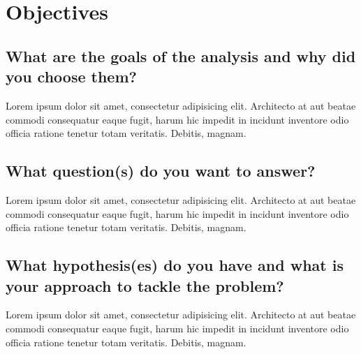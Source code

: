 \section{Objectives}

\subsection{What are the goals of the analysis and why did you choose them?}

Lorem ipsum dolor sit amet, consectetur adipisicing elit. Architecto at aut beatae commodi consequatur eaque fugit, harum hic impedit in incidunt inventore odio officia ratione tenetur totam veritatis. Debitis, magnam.

\subsection{What question(s) do you want to answer?}

Lorem ipsum dolor sit amet, consectetur adipisicing elit. Architecto at aut beatae commodi consequatur eaque fugit, harum hic impedit in incidunt inventore odio officia ratione tenetur totam veritatis. Debitis, magnam.

\subsection{What hypothesis(es) do you have and what is your approach to tackle the problem?}

Lorem ipsum dolor sit amet, consectetur adipisicing elit. Architecto at aut beatae commodi consequatur eaque fugit, harum hic impedit in incidunt inventore odio officia ratione tenetur totam veritatis. Debitis, magnam.
